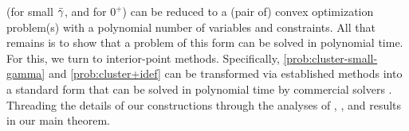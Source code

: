 (for small ${\bar\gamma}$, and for $0^+$)
%
can be reduced to a (pair of) convex optimization problem(s) with a
polynomial number of variables and constraints.
All that remains 
is to show that a problem of this form can be solved in polynomial time.
For this, we turn to interior-point methods.
Specifically, \eqref{prob:cluster-small-gamma} and \eqref{prob:cluster+idef} can be transformed via established methods \parencite{agrawal2018rewriting} into
a standard form
that
can be solved in polynomial time by commercial solvers \parencite{mosek,ECOS}.
Threading the details of our constructions through
the analyses of \textcite{dahl2022primal}, \textcite{skajaa2015homogeneous}, and \textcite{nesterov1996infeasible}
results in our main theorem.



